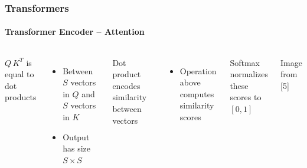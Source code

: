 \documentclass[xetex,professionalfont]{beamer}
\begin{document}
\begin{frame}
	\frametitle{Transformers}
	\framesubtitle{Transformer Encoder -- Attention}

	\begin{columns}

		$Q\,K^T$ is equal to dot products
		\begin{itemize}
			\item Between $S$ vectors in $Q$ and $S$ vectors in $K$
			\item Output has size $S\times S$ %
		\end{itemize}

		\bigskip

		Dot product encodes similarity between vectors
		\begin{itemize}
			\item Operation above computes similarity scores
		\end{itemize}

		\bigskip

		Softmax normalizes these scores to $[0,1]$


		\begin{center}
			{\centering Image from [5]}
		\end{center}

	\end{columns}

\end{frame}
\end{document}
